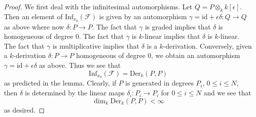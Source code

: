 \begin{proof}
We first deal with the infinitesimal automorphisms.
Let $Q = P \otimes_k k[\epsilon]$.
Then an element of $\text{Inf}_{x_0}(\mathcal{F})$
is given by an automorphism
$\gamma = \text{id} + \epsilon \delta : Q \to Q$
as above where now $\delta : P \to P$.
The fact that $\gamma$ is graded implies that
$\delta$ is homogeneous of degree $0$.
The fact that $\gamma$ is $k$-linear implies that
$\delta$ is $k$-linear.
The fact that $\gamma$ is multiplicative implies that
$\delta$ is a $k$-derivation.
Conversely, given a $k$-derivation $\delta : P \to P$
homogeneous of degree $0$, we obtain an automorphism
$\gamma = \text{id} + \epsilon \delta$ as above.
Thus we see that
$$
\text{Inf}_{x_0}(\mathcal{F}) = \text{Der}_k(P, P)
$$
as predicted in the lemma.
Clearly, if $P$ is generated in degrees $P_i$,
$0 \leq i \leq N$, then $\delta$ is determined by
the linear maps $\delta_i : P_i \to P_i$ for
$0 \leq i \leq N$ and we see that
$$
\dim_k \text{Der}_k(P, P) < \infty
$$
as desired.


\end{proof}

